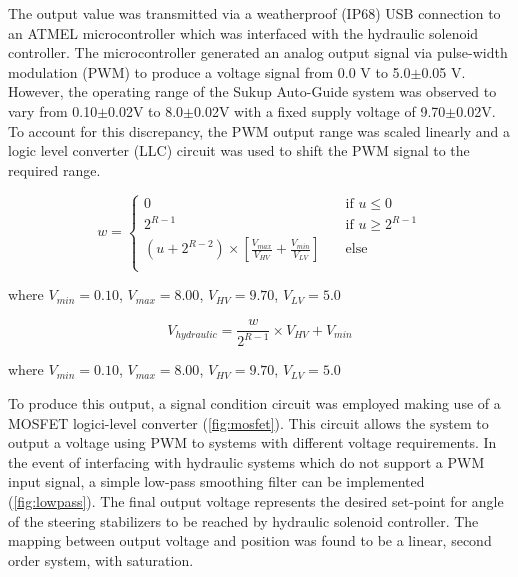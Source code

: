 \documentclass[authoryear]{elsarticle}
\begin{document}
The output value was transmitted via a weatherproof (IP68) USB
connection to an ATMEL microcontroller which was interfaced with the
hydraulic solenoid controller. The microcontroller generated an analog
output signal via pulse-width modulation (PWM) to produce a voltage
signal from 0.0 V to 5.0$\pm$0.05 V. However, the operating range of
the Sukup Auto-Guide system was observed to vary from 0.10$\pm$0.02V
to 8.0$\pm$0.02V with a fixed supply voltage of 9.70$\pm$0.02V. To
account for this discrepancy, the PWM output range was scaled linearly
and a logic level converter (LLC) circuit was used to
shift the PWM signal to the required range.

\begin{equation}
  w = 
  \begin{cases}
    0 & \quad \text{if } u \leq 0 \\
    2^{R-1} & \quad \text{if } u \geq 2^{R-1}\\
    (u +2^{R-2})\times\left[\frac{V_{max}}{V_{HV}}+\frac{V_{min}}{V_{LV}}\right] & \quad \text{else} \\
  \end{cases}
  \label{eq:v_out}
\end{equation}
\begin{flushleft}
where $V_{min}=0.10$, $V_{max}=8.00$, $V_{HV}=9.70$, $V_{LV}=5.0$
\end{flushleft}

\begin{equation}
  V_{hydraulic} = \frac{w}{2^{R-1}} \times V_{HV} + V_{min}
  \label{eq:v_out}
\end{equation}
\begin{flushleft}
where $V_{min}=0.10$, $V_{max}=8.00$, $V_{HV}=9.70$, $V_{LV}=5.0$
\end{flushleft}

To produce this output, a signal condition circuit was employed making
use of a MOSFET logici-level converter (\ref{fig:mosfet}). This
circuit allows the system to output a voltage using PWM to systems
with different voltage requirements. In the event of interfacing with
hydraulic systems which do not support a PWM input signal, a simple
low-pass smoothing filter can be implemented (\ref{fig:lowpass}). The
final output voltage represents the desired set-point for angle of the
steering stabilizers to be reached by hydraulic solenoid
controller. The mapping between output voltage and position was found
to be a linear, second order system, with saturation.
\end{document}
